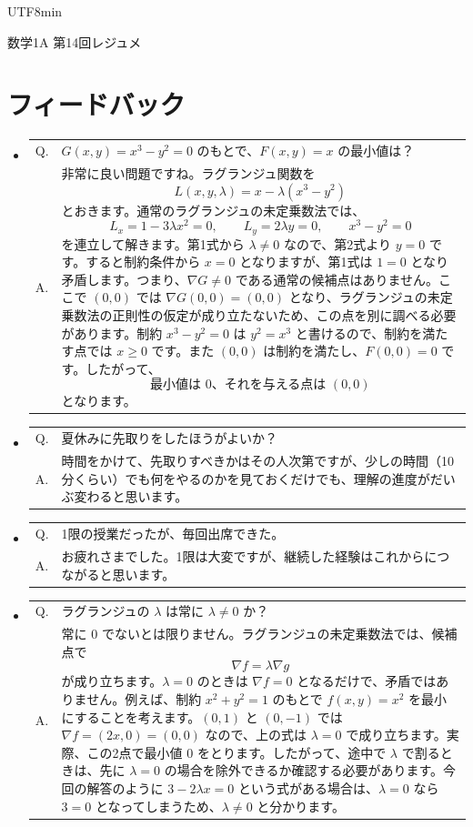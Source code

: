 \documentclass[a4paper,12pt]{article}
\makeatletter
\newcommand{\feedbackqa}[2]{%
\item[]
\begin{tabular}[t]{@{}p{1.8em}@{\hspace{0.4em}}p{\dimexpr\linewidth-2.2em\relax}@{}}
Q. & #1 \\
A. & #2
\end{tabular}
\par\smallskip\hrulefill
}
\makeatother
\begin{document}
\ifPDFTeX
\begin{CJK}{UTF8}{min}
\fi

\theoremstyle{definition}
\newtheorem*{definition}{定義}
\newtheorem*{theorem}{定理}
\newtheorem*{example}{例}
\newtheorem*{remark}{注意}
\renewcommand{\proofname}{\normalfont 証明}

\begin{center}
{\LARGE 数学1A 第14回レジュメ}\\[0.4em]
\end{center}

\section*{フィードバック}

\begin{itemize}[leftmargin=1.5em,itemsep=0.7em,topsep=0.3em]
\feedbackqa{$G(x,y)=x^3-y^2=0$ のもとで、$F(x,y)=x$ の最小値は？}{非常に良い問題ですね。ラグランジュ関数を\[L(x,y,\lambda)=x-\lambda(x^3-y^2)\]とおきます。通常のラグランジュの未定乗数法では、\[L_x=1-3\lambda x^2=0,\qquad L_y=2\lambda y=0,\qquad x^3-y^2=0\]を連立して解きます。第1式から $\lambda\ne0$ なので、第2式より $y=0$ です。すると制約条件から $x=0$ となりますが、第1式は $1=0$ となり矛盾します。つまり、$\nabla G\ne0$ である通常の候補点はありません。ここで $(0,0)$ では $\nabla G(0,0)=(0,0)$ となり、ラグランジュの未定乗数法の正則性の仮定が成り立たないため、この点を別に調べる必要があります。制約 $x^3-y^2=0$ は $y^2=x^3$ と書けるので、制約を満たす点では $x\geq0$ です。また $(0,0)$ は制約を満たし、$F(0,0)=0$ です。したがって、\[{\text{最小値は }0\text{、それを与える点は }(0,0)}\]となります。}
\feedbackqa{夏休みに先取りをしたほうがよいか？}{時間をかけて、先取りすべきかはその人次第ですが、少しの時間（10分くらい）でも何をやるのかを見ておくだけでも、理解の進度がだいぶ変わると思います。}
\feedbackqa{1限の授業だったが、毎回出席できた。}{お疲れさまでした。1限は大変ですが、継続した経験はこれからにつながると思います。}
\feedbackqa{ラグランジュの $\lambda$ は常に $\lambda\ne0$ か？}{常に $0$ でないとは限りません。ラグランジュの未定乗数法では、候補点で\[\nabla f=\lambda\nabla g\]が成り立ちます。$\lambda=0$ のときは $\nabla f=0$ となるだけで、矛盾ではありません。例えば、制約 $x^2+y^2=1$ のもとで $f(x,y)=x^2$ を最小にすることを考えます。$(0,1)$ と $(0,-1)$ では $\nabla f=(2x,0)=(0,0)$ なので、上の式は $\lambda=0$ で成り立ちます。実際、この2点で最小値 $0$ をとります。したがって、途中で $\lambda$ で割るときは、先に $\lambda=0$ の場合を除外できるか確認する必要があります。今回の解答のように $3-2\lambda x=0$ という式がある場合は、$\lambda=0$ なら $3=0$ となってしまうため、$\lambda\ne0$ と分かります。}

\end{itemize}
\end{CJK}
\end{document}
